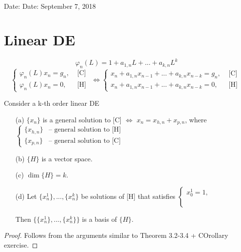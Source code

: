 \documentclass[twoside]{article}
\begin{document}

\hfill Date: Date: September 7, 2018

\section{Linear DE}
\begin{equation}
    \varphi_{n}(L) = 1 + a_{1,n}L + ... + a_{k,n}L^{k}
\end{equation}
\[
\begin{cases}
    \varphi_{n}(L)x_{n} = g_{n}, &\text{ [C] }\\
    \varphi_{n}(L)x_{n} = 0    , &\text{ [H] }
\end{cases}
\iff
\begin{cases}
    x_n + a_{1,n}x_{n-1}+ ...+ a_{k,n} x_{n-k} = g_{n}, &\text{ [C] }\\
    x_n + a_{1,n}x_{n-1}+ ...+ a_{k,n} x_{n-k} = 0    , &\text{ [H] }    
\end{cases}
\]

\begin{theorem}
    Consider a k-th order linear DE
    \begin{enumerate}
        \item [(a)] $\{x_{n}\}$ is a general solution to [C] $\iff$ $x_{n} = x_{h,n}+ x_{p,n}$, where $\begin{cases}
            \{x_{h,n}\} &\text{-- general solution to [H] }\\
            \{x_{p,n}\} &\text{-- general solution to [C] }
        \end{cases}$
        \item [(b)] $\{ H \}$ is a vector space.
        \item [(c)] $\dim \{ H \} = k$.
        \item [(d)] Let $\{x_{n}^{1} \}, ..., \{x_{n}^{k} \}$ be solutions of [H] that satisfies $\begin{cases}
            x_{0}^{1} = 1, \\
            \\
            \\

        \end{cases}$

        Then $\{ \{x_{n}^{1} \}, ..., \{x_{n}^{k} \} \}$ is a basis of $\{H\}$.
    \end{enumerate}
\end{theorem}
\begin{proof}
    Follows from the arguments similar to Theorem 3.2-3.4 + COrollary exercise.
\end{proof}
\end{document}
